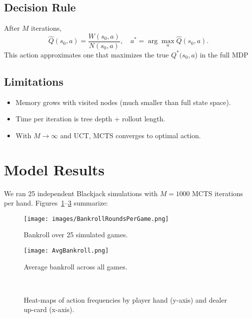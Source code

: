 \documentclass[12pt,a4paper]{cibb}
\begin{document}
\subsection{{Decision Rule}}
After \(M\) iterations,
\[
 \hat Q(s_0,a)=\frac{W(s_0,a)}{N(s_0,a)},\quad a^*=\arg\max_a \hat Q(s_0,a).
\]
This action approximates one that maximizes the true $Q^*(s_0,a$) in the full MDP

\subsection{{Limitations}}
\begin{itemize}[leftmargin=1.5cm]
  \item Memory grows with visited nodes (much smaller than full state space).  
  \item Time per iteration is tree depth + rollout length.  
  \item With \(M\to\infty\) and UCT, MCTS converges to optimal action.  
\end{itemize}

\section{Model Results}
We ran 25 independent Blackjack simulations with \(M=1000\) MCTS iterations per hand.  Figures~\ref{fig:bankroll}–\ref{fig:action_heatmaps} summarize:

\begin{figure}[H]
  \centering
  \texttt{[image: images/BankrollRoundsPerGame.png]}
  \caption{Bankroll over 25 simulated games.}
  \label{fig:bankroll}
\end{figure}

\begin{figure}[H]
  \centering
  \texttt{[image: AvgBankroll.png]}
  \caption{Average bankroll across all games.}
  \label{fig:avg_bankroll}
\end{figure}

\begin{figure}[H]
  \centering
  \\
  \caption{Heat-maps of action frequencies by player hand (y-axis) and dealer up-card (x-axis).}
  \label{fig:action_heatmaps}
\end{figure}
\end{document}
